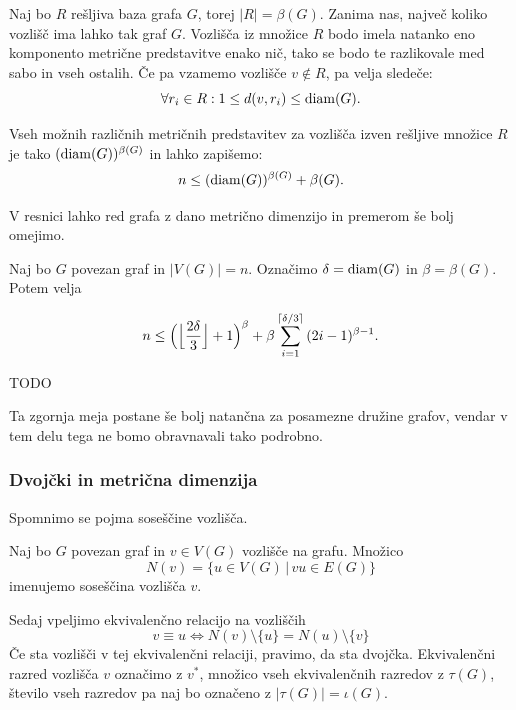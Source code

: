 \documentclass[mat1, tisk]{fmfdelo}
\begin{document}
\begin{dokaz}
    Naj bo $R$ rešljiva baza grafa $G$, torej $|R| = \beta(G).$ Zanima nas, največ koliko 
    vozlišč ima lahko tak graf $G$. Vozlišča iz množice $R$ bodo imela natanko eno 
    komponento metrične predstavitve enako nič, tako se bodo te razlikovale med sabo in 
    vseh ostalih. Če pa vzamemo vozlišče $v \notin R$, pa velja sledeče:
    $$\forall r_i \in R: 1 \leq d(v, r_i) \leq {\rm diam}(G).$$
    
    Vseh možnih različnih metričnih predstavitev za vozlišča izven rešljive množice $R$ 
    je tako $({\rm diam}(G))^{\beta (G)}$
    in lahko zapišemo:
    $$n \leq ({\rm diam}(G))^{\beta (G)} + \beta (G).$$
\end{dokaz}

V resnici lahko red grafa z dano metrično dimenzijo in premerom še bolj omejimo.

\begin{trditev}
    Naj bo $G$ povezan graf in $|V(G)| = n$. Označimo $ \delta = {\rm diam}(G)$ in 
    $\beta = \beta (G)$. Potem velja

    $$n \leq \Bigl ( \Bigl \lfloor {\frac{2 \delta}{3}}\Bigr \rfloor + 1 \Bigr )^{\beta} + 
    \beta \sum_{i = 1}^{\lceil \delta /3 \rceil} {(2i - 1)^{\beta - 1}}. $$
\end{trditev}

\begin{dokaz}
    TODO
\end{dokaz}

Ta zgornja meja postane še bolj natančna za posamezne družine grafov, vendar v tem delu
tega ne bomo obravnavali tako podrobno.




\subsubsection{Dvojčki in metrična dimenzija}
Spomnimo se pojma soseščine vozlišča.

\begin{definicija}
    Naj bo $G$ povezan graf in $v \in V(G)$ vozlišče na grafu. Množico 
    $$N(v) = \{u \in V(G) \, | \,vu \in E(G) \}$$ imenujemo soseščina vozlišča $v$.
\end{definicija}

Sedaj vpeljimo ekvivalenčno relacijo na vozliščih
$$v \equiv u \Leftrightarrow N(v)\setminus \{u\} = N(u) \setminus \{v\}$$
Če sta vozlišči v tej ekvivalenčni relaciji, pravimo, da sta dvojčka. 
Ekvivalenčni razred vozlišča $v$ označimo z $v^{*}$, 
množico vseh ekvivalenčnih razredov z $\tau (G)$, število vseh razredov pa naj bo označeno 
z $|\tau(G)| = \iota(G).$
\end{document}
